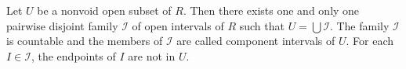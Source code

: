 Let $U$ be a nonvoid open subset of $R$. Then there exists one and only one pairwise disjoint family $\mathcal{I}$ of open intervals of $R$ such that $U = \bigcup \mathcal{I}$. The family $\mathcal{I}$ is countable and the members of $\mathcal{I}$ are called component intervals of $U$. For each $I \in \mathcal{I}$, the endpoints of $I$ are not in $U$.